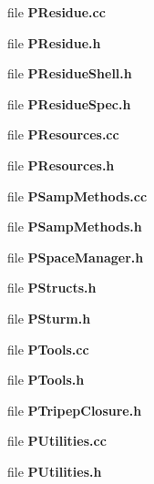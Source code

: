 \begin{CompactItemize}
\item 
file {\bf PResidue.cc}
\item 
file {\bf PResidue.h}
\item 
file {\bf PResidue\-Shell.h}
\item 
file {\bf PResidue\-Spec.h}
\item 
file {\bf PResources.cc}
\item 
file {\bf PResources.h}
\item 
file {\bf PSamp\-Methods.cc}
\item 
file {\bf PSamp\-Methods.h}
\item 
file {\bf PSpace\-Manager.h}
\item 
file {\bf PStructs.h}
\item 
file {\bf PSturm.h}
\item 
file {\bf PTools.cc}
\item 
file {\bf PTools.h}
\item 
file {\bf PTripep\-Closure.h}
\item 
file {\bf PUtilities.cc}
\item 
file {\bf PUtilities.h}
\end{CompactItemize}

